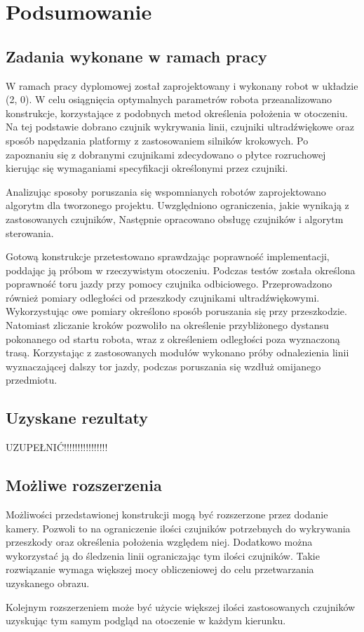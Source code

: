 \chapter{Podsumowanie}
\section{Zadania wykonane w ramach pracy}
W ramach pracy dyplomowej został zaprojektowany i wykonany robot w układzie (2, 0). W celu osiągnięcia optymalnych parametrów robota przeanalizowano konstrukcje, korzystające z podobnych metod określenia położenia w otoczeniu. Na tej podstawie dobrano czujnik wykrywania linii, czujniki ultradźwiękowe oraz sposób napędzania platformy z zastosowaniem silników krokowych. Po zapoznaniu się z dobranymi czujnikami zdecydowano o płytce rozruchowej kierując się wymaganiami specyfikacji określonymi przez czujniki.

Analizując sposoby poruszania się wspomnianych robotów zaprojektowano algorytm dla tworzonego projektu. Uwzględniono ograniczenia, jakie wynikają z zastosowanych czujników, Następnie opracowano obsługę czujników i algorytm sterowania. 

Gotową konstrukcje przetestowano sprawdzając poprawność implementacji, poddając ją próbom w rzeczywistym otoczeniu. Podczas testów została określona poprawność toru jazdy przy pomocy czujnika odbiciowego. Przeprowadzono również pomiary odległości od przeszkody czujnikami ultradźwiękowymi. Wykorzystując owe pomiary określono sposób poruszania się przy przeszkodzie. Natomiast zliczanie kroków pozwoliło na określenie przybliżonego dystansu pokonanego od startu robota, wraz z określeniem odległości poza wyznaczoną trasą. Korzystając z zastosowanych modułów wykonano próby odnalezienia linii wyznaczającej dalszy tor jazdy, podczas poruszania się wzdłuż omijanego przedmiotu.

\section{Uzyskane rezultaty}
UZUPEŁNIĆ!!!!!!!!!!!!!!!!

\section{Możliwe rozszerzenia}
Możliwości przedstawionej konstrukcji mogą być rozszerzone przez dodanie kamery. Pozwoli to na ograniczenie ilości czujników potrzebnych do wykrywania przeszkody oraz określenia położenia względem niej. Dodatkowo można wykorzystać ją do śledzenia linii ograniczając tym ilości czujników. Takie rozwiązanie wymaga większej mocy obliczeniowej do celu przetwarzania uzyskanego obrazu.

Kolejnym rozszerzeniem może być użycie większej ilości zastosowanych czujników uzyskując tym samym podgląd na otoczenie w każdym kierunku.